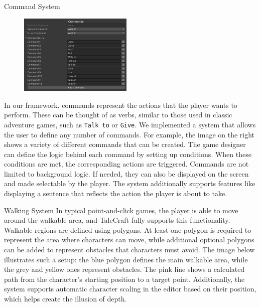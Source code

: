 \documentclass[portrait,a0paper,fontscale=0.35]{baposter}
\begin{document}
\begin{poster}
\begin{posterbox}[column=0, span=1, name=cs, below=architecture]{Command System}

\begin{figure}
\centering
\includegraphics[width=0.48\textwidth]{img/image_2025-07-04_190803886.png}
\end{figure}

In our framework, commands represent the actions that the player wants to perform. These can be thought of as verbs, similar to those used in classic adventure games, such as \texttt{Talk to} or \texttt{Give}. We implemented a system that allows the user to define any number of commands. For example, the image on the right shows a variety of different commands that can be created. The game designer can define the logic behind each command by setting up conditions. When these conditions are met, the corresponding actions are triggered. Commands are not limited to background logic. If needed, they can also be displayed on the screen and made selectable by the player. The system additionally supports features like displaying a sentence that reflects the action the player is about to take.

\end{posterbox}

\begin{posterbox}[column=0, span=1, name=ws, below=cs]{Walking System}
In typical point-and-click games, the player is able to move around the walkable area, and TaleCraft fully supports this functionality. Walkable regions are defined using polygons. At least one polygon is required to represent the area where characters can move, while additional optional polygons can be added to represent obstacles that characters must avoid. The image below illustrates such a setup: the blue polygon defines the main walkable area, while the grey and yellow ones represent obstacles. The pink line shows a calculated path from the character's starting position to a target point. Additionally, the system supports automatic character scaling in the editor based on their position, which helps create the illusion of depth. 


\end{posterbox}
\end{poster}
\end{document}
